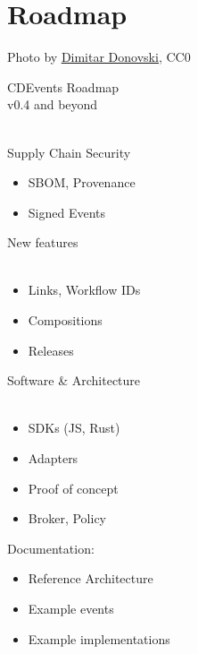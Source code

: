\documentclass[aspectratio=169,11pt,hyperref={colorlinks=true}]{beamer}
\begin{document}
\section{Roadmap}
\begin{sectionwithpiclargecentral}{Photo by \href{https://unsplash.com/@dmtrdon}{\underline{Dimitar Donovski}}, CC0}
\end{sectionwithpiclargecentral}

\begin{stripedframe}%
  {%
  CDEvents Roadmap \\
  v0.4 and beyond \\
  ~
  }%
  {%
  Supply Chain Security
  \begin{itemize}
    \item SBOM, Provenance
  \end{itemize}
  \begin{itemize}
    \item Signed Events
  \end{itemize}
  }%
  {%
  New features \\
  ~
  \begin{itemize}
    \item Links, Workflow IDs
    \item Compositions
    \item Releases
  \end{itemize}
  }%
  {%
  Software \& Architecture\\
  ~
  \begin{itemize}
    \item SDKs (JS, Rust)
    \item Adapters
    \item Proof of concept
    \item Broker, Policy
  \end{itemize}
  }%
  {%
  Documentation:
  \begin{itemize}
    \item Reference Architecture
    \item Example events
    \item Example implementations
  \end{itemize}
  }%
\end{stripedframe}
\end{document}
